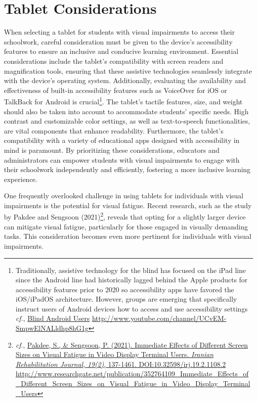 \documentclass[12pt,letterpaper,twoside,openright]{report}
\begin{document}
\pagebreak\hypertarget{tablet-considerations}{}\section{Tablet Considerations}\label{tab:tablelet-considerations}

When selecting a tablet for students with visual impairments to access their schoolwork, careful consideration must be given to the device's accessibility features to ensure an inclusive and conducive learning environment. Essential considerations include the tablet's compatibility with screen readers and magnification tools, ensuring that these assistive technologies seamlessly integrate with the device's operating system. Additionally, evaluating the availability and effectiveness of built-in accessibility features such as VoiceOver for iOS or TalkBack for Android is crucial\footnote{\raggedright Traditionally, assistive technology for the blind has focused on the iPad line since the Android line had historically lagged behind the Apple products for accessibility features prior to 2020 so accessibility apps have favored the iOS/iPadOS architecture. However, groups are emerging that specifically instruct users of Android devices how to access and use accessibility settings \textit{cf.}, \href{http://www.youtube.com/channel/UCvEM-SmpwElNALldhp8hG1g}{Blind Android Users} \url{http://www.youtube.com/channel/UCvEM-SmpwElNALldhp8hG1g}}. The tablet's tactile features, size, and weight should also be taken into account to accommodate students' specific needs. High contrast and customizable color settings, as well as text-to-speech functionalities, are vital components that enhance readability. Furthermore, the tablet's compatibility with a variety of educational apps designed with accessibility in mind is paramount. By prioritizing these considerations, educators and administrators can empower students with visual impairments to engage with their schoolwork independently and efficiently, fostering a more inclusive learning experience.

One frequently overlooked challenge in using tablets for individuals with visual impairments is the potential for visual fatigue. Recent research, such as the study by Pakdee and Sengsoon (2021)\footnote{\raggedright \textit{cf}., \href{http://www.researchgate.net/publication/352764109_Immediate_Effects_of_Different_Screen_Sizes_on_Visual_Fatigue_in_Video_Display_Terminal_Users}{Pakdee, S., \& Sengsoon, P. (2021). Immediate Effects of Different Screen Sizes on Visual Fatigue in Video Display Terminal Users. \textit{Iranian Rehabilitation Journal, 19(2)}, 137-1461. DOI:10.32598/irj.19.2.1108.2} \hfill\break\url{http://www.researchgate.net/publication/352764109_Immediate_Effects_of_Different_Screen_Sizes_on_Visual_Fatigue_in_Video_Display_Terminal_Users}}, reveals that opting for a slightly larger device can mitigate visual fatigue, particularly for those engaged in visually demanding tasks. This consideration becomes even more pertinent for individuals with visual impairments.
\end{document}
